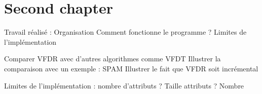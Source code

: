 \section{Second chapter}



Travail réalisé :  
Organisation  
Comment fonctionne le programme ?
Limites de l’implémentation

Comparer VFDR avec d’autres algorithmes comme VFDT
Illustrer la comparaison avec un exemple : SPAM
Illustrer le fait que VFDR soit incrémental

Limites de l’implémentation : nombre d’attributs ? Taille attributs ? Nombre
